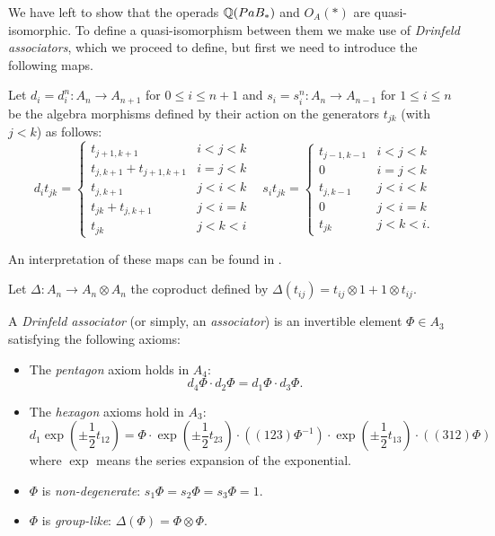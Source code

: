 \documentclass[TFM.tex]{subfiles}
\begin{document}
We have left to show that the operads $\mathbb{Q}(PaB_*)$ and $O_A(*)$ are quasi-isomorphic. To define a quasi-isomorphism between them we make use of \emph{Drinfeld associators}, which we proceed to define, but first we need to introduce the following maps.

\begin{defi}
Let $d_i = d^n_i : A_n → A_{n+1}$ for $0 ≤ i ≤ n + 1$ and $s_i = s^n_i : A_n → A_{n−1}$
for $1 ≤ i ≤ n$ be the algebra morphisms defined by their action on the generators $t_{jk}$ (with
$j < k$) as follows:
\[
d_it_{jk} =\begin{cases}
t_{j+1,k+1} & i < j < k\\
t_{j,k+1} + t_{j+1,k+1} & i = j < k\\
t_{j,k+1} & j < i < k\\
t_{jk} + t_{j,k+1} & j < i = k\\
t_{jk} & j < k < i
\end{cases}\ \ \ \
s_it_{jk} =\begin{cases}
t_{j−1,k−1} & i < j < k\\
0 & i = j < k\\
t_{j,k−1} & j < i < k\\
0 & j < i = k\\
t_{jk} & j < k < i.
\end{cases}
\]


\end{defi}
An interpretation of these maps can be found in \cite{1deTamarkin}. 

\begin{defi}
Let $\Delta:A_n\to A_n\otimes A_n$ the coproduct defined by $\Delta(t_{ij})=t_{ij}\otimes 1+1\otimes t_{ij}$. 
\end{defi}

\begin{defi}
A \emph{Drinfeld associator} (or simply, an \emph{associator}) is an invertible element $\Phi\in A_3$ satisfying the following
axioms:
\begin{itemize}
\item The \emph{pentagon} axiom holds in $A_4$:
\[
d_4\Phi\cdot d_2\Phi=d_1\Phi\cdot d_3\Phi.
\]
\item The \emph{hexagon} axioms hold in $A_3$:
\[
d_1\exp\left(\pm\frac{1}{2}t_{12}\right)=\Phi\cdot\exp\left(\pm\frac{1}{2}t_{23}\right)\cdot ((123)\Phi^{-1})\cdot\exp\left(\pm\frac{1}{2}t_{13}\right)\cdot((312)\Phi)
\]
where $\exp$ means the series expansion of the exponential. 
\item $\Phi$ is \emph{non-degenerate}: $s_1\Phi=s_2\Phi=s_3\Phi=1$.
\item $\Phi$ is \emph{group-like}: $\Delta(\Phi)=\Phi\otimes\Phi$. %
\end{itemize}
\end{defi}
\end{document}
